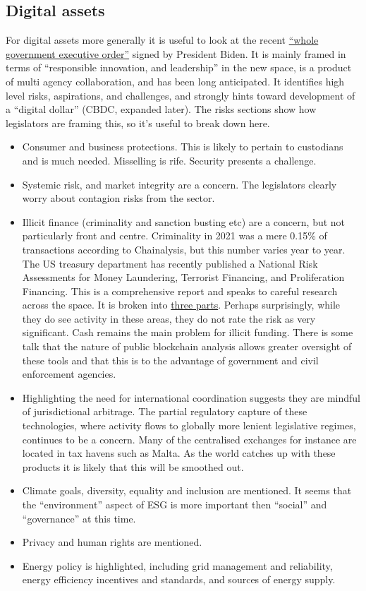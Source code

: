 \subsection{Digital assets}
For digital assets more generally it is useful to look at the recent \href{https://www.whitehouse.gov/briefing-room/presidential-actions/2022/03/09/executive-order-on-ensuring-responsible-development-of-digital-assets/}{``whole government executive order''} signed by President Biden. It is mainly framed in terms of ``responsible innovation, and leadership'' in the new space, is a product of multi agency collaboration, and has been long anticipated. It identifies high level risks, aspirations, and challenges, and strongly hints toward development of a ``digital dollar'' (CBDC, expanded later). The risks sections show how legislators are framing this, so it's useful to break down here.\par
\begin{itemize}
\item Consumer and business protections. This is likely to pertain to custodians and is much needed. Misselling is rife. Security presents a challenge.  
\item Systemic risk, and market integrity are a concern. The legislators clearly worry about contagion risks from the sector.
\item Illicit finance (criminality and sanction busting etc) are a concern, but not particularly front and centre\cite{moser2013inquiry}. Criminality in 2021 was a mere 0.15\% of transactions according to Chainalysis, but this number varies year to year. The US treasury department has recently published a National Risk Assessments for Money Laundering, Terrorist Financing, and Proliferation Financing. This is a comprehensive report and speaks to careful research across the space. It is broken into \href{https://home.treasury.gov/news/press-releases/jy0619}{three parts}. Perhaps surprisingly, while they do see activity in these areas, they do not rate the risk as very significant. Cash remains the main problem for illicit funding. There is some talk that the nature of public blockchain analysis allows greater oversight of these tools and that this is to the advantage of government and civil enforcement agencies.
\item Highlighting the need for international coordination suggests they are mindful of jurisdictional arbitrage. 
The partial regulatory capture of these technologies, where activity flows to globally more lenient legislative regimes, continues to be a concern. Many of the centralised exchanges for instance are located in tax havens such as Malta. As the world catches up with these products it is likely that this will be smoothed out.
\item Climate goals, diversity, equality and inclusion are mentioned. It seems that the ``environment'' aspect of ESG is more important then ``social'' and ``governance'' at this time.
\item Privacy and human rights are mentioned.
\item Energy policy is highlighted, including grid management and reliability, energy efficiency incentives and standards, and sources of energy supply.
\end{itemize}

